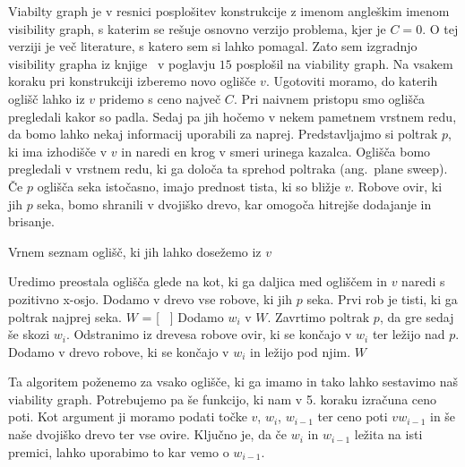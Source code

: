 \documentclass{article}
\begin{document}
Viabilty graph je v resnici posplošitev konstrukcije z imenom angleškim imenom visibility graph, s katerim se rešuje osnovno verzijo problema, kjer je $C = 0$. O tej verziji je več literature, s katero sem si lahko pomagal. Zato sem izgradnjo visibility grapha iz knjige~\cite{BCKO} v poglavju $15$ posplošil na viability graph. 
Na vsakem koraku pri konstrukciji izberemo novo oglišče $v$. Ugotoviti moramo, do katerih oglišč lahko iz $v$ pridemo s ceno največ $C$. Pri naivnem pristopu smo oglišča pregledali kakor so padla. Sedaj pa jih hočemo v nekem pametnem vrstnem redu, da bomo lahko nekaj informacij uporabili za naprej. Predstavljajmo si poltrak $p$, ki ima izhodišče v $v$ in naredi en krog v smeri urinega kazalca. Oglišča bomo pregledali v vrstnem redu, ki ga določa ta sprehod poltraka (ang.\ plane sweep). Če $p$ oglišča seka istočasno, imajo prednost tista, ki so bližje $v$.
Robove ovir, ki jih $p$ seka, bomo shranili v dvojiško drevo, kar omogoča hitrejše dodajanje in brisanje.

\begin{algorithm}
    \caption{Vrnem seznam oglišč, ki jih lahko dosežemo iz $v$}
    \begin{algorithmic}[1]
        \State Uredimo preostala oglišča glede na kot, ki ga daljica med ogliščem in $v$ naredi s pozitivno x-osjo.
        \State  Dodamo v drevo vse robove, ki jih $p$ seka. Prvi rob je tisti, ki ga poltrak najprej seka.
        \State $W$ = [ \ ]
            \State Dodamo $w_i$ v $W$.
        \EndIf
        \State Zavrtimo poltrak $p$, da gre sedaj še skozi $w_i$.
        \State Odstranimo iz drevesa robove ovir, ki se končajo v $w_i$ ter ležijo nad $p$.
        \State Dodamo v drevo robove, ki se končajo v $w_i$ in ležijo pod njim.
        \EndFor
        \State \Return $W$
    \end{algorithmic}
\end{algorithm}

Ta algoritem poženemo za vsako oglišče, ki ga imamo in tako lahko sestavimo naš viability graph. Potrebujemo pa še funkcijo, ki nam v 5. koraku izračuna ceno poti. Kot argument ji moramo podati točke $v$, $w_i$, $w_{i-1}$ ter ceno poti $vw_{i-1}$ in še naše dvojiško drevo ter vse ovire. Ključno je, da če $w_i$ in $w_{i-1}$ ležita na isti premici, lahko uporabimo to kar vemo o $w_{i-1}$.
\end{document}

